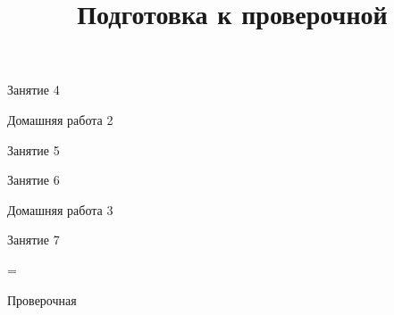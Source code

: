 \begin{class}[number=4]
	\begin{listofex}
		\item Занятие 4
	\end{listofex}
\end{class}

\begin{homework}[number=2]
	\begin{listofex}
		\item Домашняя работа 2
	\end{listofex}
\end{homework}

\begin{class}[number=5]
	\begin{listofex}
		\item Занятие 5
	\end{listofex}
\end{class}

\begin{class}[number=6]
	\begin{listofex}
		\item Занятие 6
	\end{listofex}
\end{class}

\begin{homework}[number=3]
	\begin{listofex}
		\item Домашняя работа 3
	\end{listofex}
\end{homework}

\begin{class}[number=7]
	\title{Подготовка к проверочной}
	\begin{listofex}
		\item Занятие 7
	\end{listofex}
\end{class}

=%
\begin{exam}
	\begin{listofex}
		\item Проверочная
	\end{listofex}
\end{exam}
